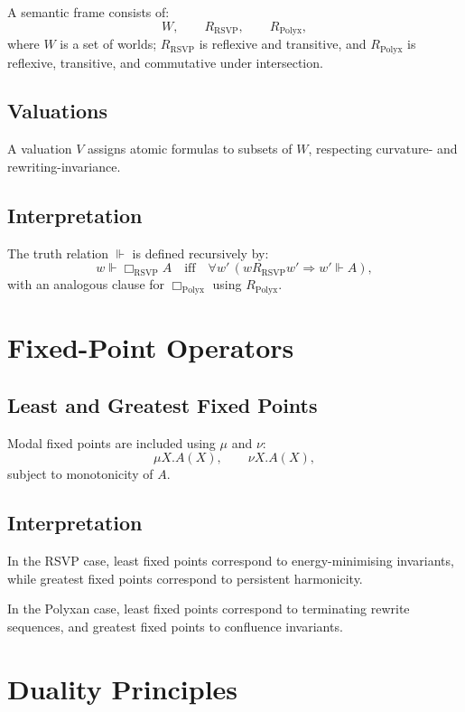 A semantic frame consists of:
\[
W,\qquad 
R_{\mathrm{RSVP}}, \qquad
R_{\mathrm{Polyx}},
\]
where $W$ is a set of worlds; $R_{\mathrm{RSVP}}$ is reflexive and transitive, and $R_{\mathrm{Polyx}}$ is reflexive, transitive, and commutative under intersection.

\subsection{Valuations}

A valuation $V$ assigns atomic formulas to subsets of $W$, respecting curvature- and rewriting-invariance.

\subsection{Interpretation}

The truth relation $\Vdash$ is defined recursively by:
\[
w \Vdash \Box_{\mathrm{RSVP}}A
\quad\text{iff}\quad
\forall w'\,(w R_{\mathrm{RSVP}} w' \Rightarrow w' \Vdash A),
\]
with an analogous clause for $\Box_{\mathrm{Polyx}}$ using $R_{\mathrm{Polyx}}$.

\section{Fixed-Point Operators}

\subsection{Least and Greatest Fixed Points}

Modal fixed points are included using $\mu$ and $\nu$:
\[
\mu X.A(X), \qquad \nu X.A(X),
\]
subject to monotonicity of $A$.

\subsection{Interpretation}

In the RSVP case, least fixed points correspond to energy-minimising invariants, while greatest fixed points correspond to persistent harmonicity.

In the Polyxan case, least fixed points correspond to terminating rewrite sequences, and greatest fixed points to confluence invariants.

\section{Duality Principles}

